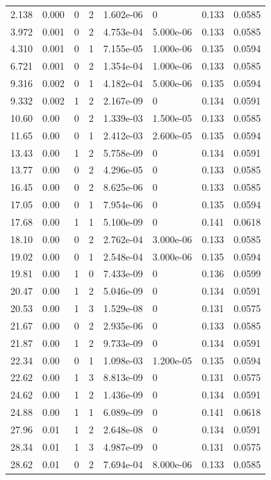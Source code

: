 \documentclass[preview]{standalone}
\begin{document}
{{\begin{tabular}{L{1.2cm}C{1.2cm} C{0.3cm}C{0.5cm} C{1.4cm}C{1.4cm} C{1.4cm}C{1.4cm}}
  2.138  &  0.000  & 0     &  2 &  1.602e-06  & 0  & 0.133 &  0.0585   \\ 
  3.972  &  0.001  & 0     &  2 &  4.753e-04  & 5.000e-06  & 0.133 &  0.0585   \\ 
  4.310  &  0.001  & 0     &  1 &  7.155e-05  & 1.000e-06  & 0.135 &  0.0594   \\ 
  6.721  &  0.001  & 0     &  2 &  1.354e-04  & 1.000e-06  & 0.133 &  0.0585   \\ 
  9.316  &  0.002  & 0     &  1 &  4.182e-04  & 5.000e-06  & 0.135 &  0.0594   \\ 
  9.332  &  0.002  & 1     &  2 &  2.167e-09  & 0  & 0.134 &  0.0591   \\ 
  10.60  &  0.00  & 0     &  2 &  1.339e-03  & 1.500e-05  & 0.133 &  0.0585   \\ 
  11.65  &  0.00  & 0     &  1 &  2.412e-03  & 2.600e-05  & 0.135 &  0.0594   \\ 
  13.43  &  0.00  & 1     &  2 &  5.758e-09  & 0  & 0.134 &  0.0591   \\ 
  13.77  &  0.00  & 0     &  2 &  4.296e-05  & 0  & 0.133 &  0.0585   \\ 
  16.45  &  0.00  & 0     &  2 &  8.625e-06  & 0  & 0.133 &  0.0585   \\ 
  17.05  &  0.00  & 0     &  1 &  7.954e-06  & 0  & 0.135 &  0.0594   \\ 
  17.68  &  0.00  & 1     &  1 &  5.100e-09  & 0  & 0.141 &  0.0618   \\ 
  18.10  &  0.00  & 0     &  2 &  2.762e-04  & 3.000e-06  & 0.133 &  0.0585   \\ 
  19.02  &  0.00  & 0     &  1 &  2.548e-04  & 3.000e-06  & 0.135 &  0.0594   \\ 
  19.81  &  0.00  & 1     &  0 &  7.433e-09  & 0  & 0.136 &  0.0599   \\ 
  20.47  &  0.00  & 1     &  2 &  5.046e-09  & 0  & 0.134 &  0.0591   \\ 
  20.53  &  0.00  & 1     &  3 &  1.529e-08  & 0  & 0.131 &  0.0575   \\ 
  21.67  &  0.00  & 0     &  2 &  2.935e-06  & 0  & 0.133 &  0.0585   \\ 
  21.87  &  0.00  & 1     &  2 &  9.733e-09  & 0  & 0.134 &  0.0591   \\ 
  22.34  &  0.00  & 0     &  1 &  1.098e-03  & 1.200e-05  & 0.135 &  0.0594   \\ 
  22.62  &  0.00  & 1     &  3 &  8.813e-09  & 0  & 0.131 &  0.0575   \\ 
  24.62  &  0.00  & 1     &  2 &  1.436e-09  & 0  & 0.134 &  0.0591   \\ 
  24.88  &  0.00  & 1     &  1 &  6.089e-09  & 0  & 0.141 &  0.0618   \\ 
  27.96  &  0.01  & 1     &  2 &  2.648e-08  & 0  & 0.134 &  0.0591   \\ 
  28.34  &  0.01  & 1     &  3 &  4.987e-09  & 0  & 0.131 &  0.0575   \\ 
  28.62  &  0.01  & 0     &  2 &  7.694e-04  & 8.000e-06  & 0.133 &  0.0585   \\ 
\hline 
\end{tabular} 

}}
\end{document}
